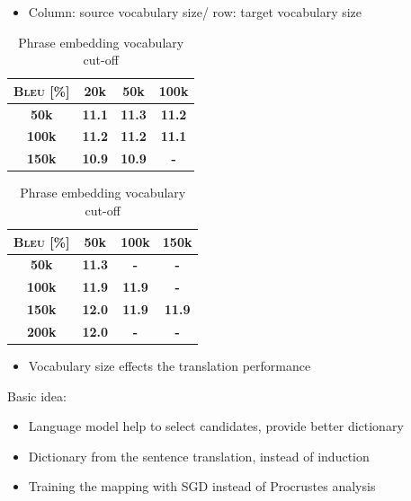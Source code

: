 \documentclass[11pt, a4paper, landscape]{article}
\begin{document}
\NewPage
{}

\begin{itemize}
	\item Column: source vocabulary size/ row: target vocabulary size
\end{itemize}


\begin{table}
	\parbox{.5\linewidth}{
		\centering
		\caption{Word embedding vocabulary cut-off}
		\begin{tabular}{>{\bfseries}c >{\bfseries}c >{\bfseries}c >{\bfseries}c } 
			\hline
			\textsc{Bleu} [\%]	& 20k & 50k & 100k \\
			\hline
			50k &	11.1  & \leavevmode\color{blue}11.3 & 11.2  \\ 
			\hline
			100k&	11.2  & 11.2 & 11.1 \\ 			
			\hline
			150k&	10.9 & 10.9 & - \\
			\hline
		\end{tabular}
		
	}
	\hfill
	\parbox{.5\linewidth}{
		\centering
		\caption{Phrase embedding vocabulary cut-off}
		\begin{tabular}{>{\bfseries}c >{\bfseries}c >{\bfseries}c >{\bfseries}c } 
			\hline
			\textsc{Bleu} [\%]	& 50k & 100k & 150k \\
			\hline
			50k &	11.3  & - & -  \\ 
			\hline
			100k&	11.9  & 11.9 & - \\ 			
			\hline
			150k&	\leavevmode\color{blue}12.0 & 11.9 & 11.9 \\
			\hline
			200k & 12.0 & - & - \\
			\hline
		\end{tabular}
		
	}
\end{table}

\begin{itemize}
	\item Vocabulary size effects the translation performance
\end{itemize}



\vfill	

\NewPage
{}
\vfill
Basic idea:
\begin{itemize}
	\item Language model help to select candidates, provide better dictionary
	\item Dictionary from the sentence translation, instead of induction
	\item Training the mapping with SGD instead of Procrustes analysis
\end{itemize}
\end{document}
